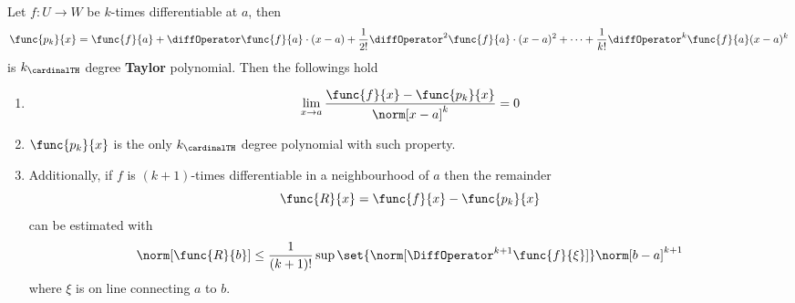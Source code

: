 \begin{theorem}
    Let \(f : U \to W\) be \(k\)-times differentiable at \(a\), then
    \begin{equation*}
        \func{p_k}{x} = \func{f}{a} + \diffOperator \func{f}{a} \cdot (x-a) + \dfrac{1}{2!} \diffOperator^2 \func{f}{a} \cdot (x-a)^2 + \dots + \dfrac{1}{k!} \diffOperator^k \func{f}{a} (x-a)^k
    \end{equation*}
    is \(k_\cardinalTH\) degree \textbf{Taylor} polynomial. Then the followings hold
    \begin{enumerate}
        \item
              \begin{equation*}
                  \lim_{x \to a} \dfrac{\func{f}{x} - \func{p_k}{x}}{\norm[x-a]^{k}} = 0
              \end{equation*}
        \item \(\func{p_k}{x}\) is the only \(k_\cardinalTH\) degree polynomial with such property.
        \item Additionally, if \(f\) is \((k + 1)\)-times differentiable in a neighbourhood of \(a\) then the remainder
              \begin{equation*}
                  \func{R}{x} = \func{f}{x} - \func{p_k}{x}
              \end{equation*}
              can be estimated with
              \begin{equation*}
                  \norm[\func{R}{b}] \leq \dfrac{1}{(k+1)!} \sup \set{\norm [\DiffOperator^{k+1} \func{f}{\xi}]} \norm[b-a]^{k+1}
              \end{equation*}
              where \(\xi\) is on line connecting \(a\) to \(b\).
    \end{enumerate}
\end{theorem}

